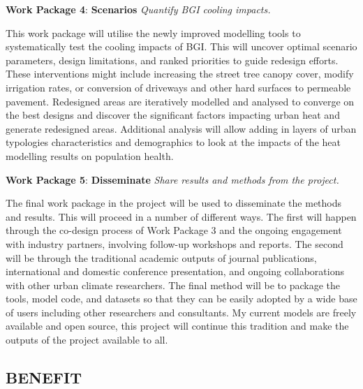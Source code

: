 \textbf{Work Package 4}: \textbf{Scenarios} \emph{Quantify BGI cooling impacts.  }

This work package will utilise the newly improved modelling tools to systematically test the cooling impacts of BGI. This will uncover optimal scenario parameters, design limitations, and ranked priorities to guide redesign efforts. These interventions might include increasing the street tree canopy cover, modify irrigation rates, or  conversion of driveways and other hard surfaces to permeable pavement. Redesigned areas are iteratively modelled and analysed to converge on the best designs and discover the significant factors impacting urban heat and generate redesigned areas. Additional analysis will allow adding in layers of urban typologies characteristics and demographics to look at the impacts of the heat modelling results on population health.
 
\textbf{Work Package 5}: \textbf{Disseminate} \emph{Share results and methods from the project.  }

The final work package in the project will be used to disseminate the methods and results. This will proceed in a number of different ways. The first will happen through the co-design process of Work Package 3 and the ongoing engagement with industry partners, involving follow-up workshops and reports. The second will be through the traditional academic outputs of journal publications, international and domestic conference presentation, and ongoing collaborations with other urban climate researchers. The final method will be to package the tools, model code, and datasets so that they can be easily adopted by a wide base of users including other researchers and consultants. My current models are freely available and open source, this project will continue this tradition and make the outputs of the project available to all.




\subsection*{\TitleFont BENEFIT}


